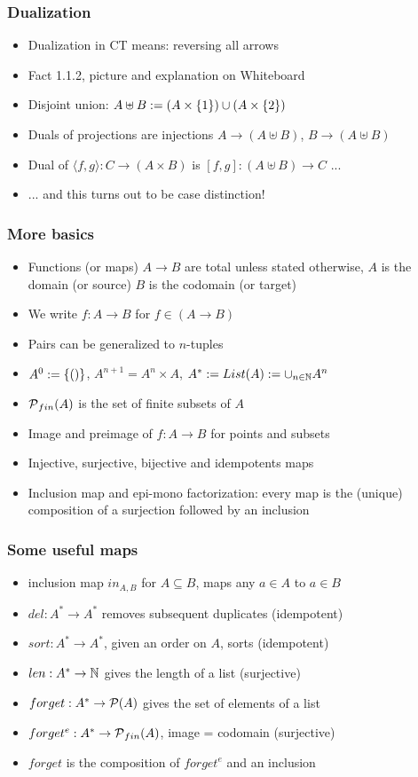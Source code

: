 \documentclass[handout]{beamer}
\begin{document}
\frame
  {   
    \frametitle{Dualization}\label{Ch3:sets}

 \begin{itemize}[<+->]
\item Dualization in CT means: reversing all arrows
\item Fact 1.1.2, picture and explanation on Whiteboard
\item Disjoint union: $A\uplus B := (A\times\{1\})\cup(A\times\{2\})$
\item Duals of projections are injections $A \to (A\uplus B)$, $B \to (A\uplus B)$
\item Dual of $\langle f,g\rangle : C \to (A\times B)$ is $[ f,g] : (A\uplus B) \to C$ ...
\item ... and this turns out to be case distinction!
 \end{itemize}

 }


\frame
  {   
     \frametitle{More basics}\label{Ch3:setbasics}

 \begin{itemize}[<+->]
\item Functions (or maps) $A\to B$ are total unless stated otherwise, 
$A$ is the domain (or source) $B$ is the codomain (or target)
\item We write $f: A\to B$ for $f\in (A\to B)$
\item Pairs can be generalized to $n$-tuples
\item $A^0 := \{()\}$, $A^{n+1}=A^n\times A$,
$A^* := List(A) := \cup_{n\in\mathbb{N}} A^n$
\item $\operatorname{\mathcal{P}}_{fin}(A)$ is the set of finite subsets of $A$
\item Image and preimage of $f: A\to B$ for points and subsets 
\item Injective, surjective, bijective and idempotents maps
\item Inclusion map and epi-mono factorization: every map
is the (unique) composition of a surjection followed by an inclusion
 \end{itemize}

 }

\frame
  {   
    \frametitle{Some useful maps}\label{Ch3:usefulmaps}

 \begin{itemize}[<+->]
\item inclusion map $in_{A,B}$ for $A\subseteq B$, maps any $a\in A$ to $a\in B$
\item $del: A^* \to A^* $ removes subsequent duplicates (idempotent)
\item $sort: A^* \to A^* $, given an order on $A$, sorts (idempotent)
\item $len: A^* \to \mathbb{N} $ gives the length of a list (surjective)
\item $forget: A^* \to \operatorname{\mathcal{P}}(A) $ gives the set of  elements of a list
\item $forget^e: A^* \to \operatorname{\mathcal{P}}_{fin}(A)$, image = codomain (surjective)
\item $forget$ is the composition of $forget^e$ and an inclusion
 \end{itemize}

 }
\end{document}

